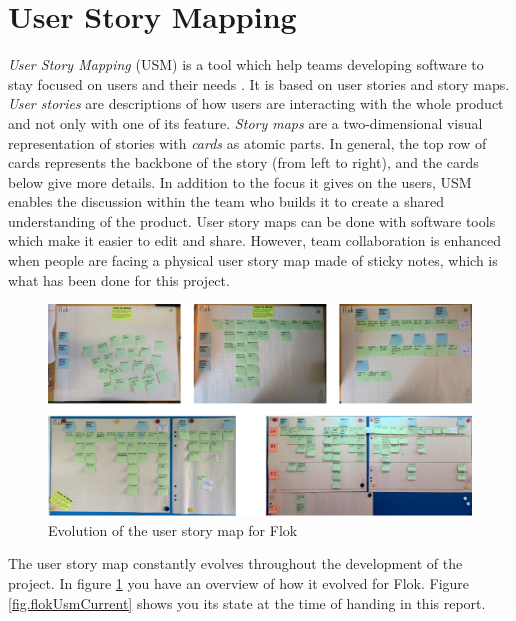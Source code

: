\documentclass[a4paper,12pt, oneside]{article}
\begin{document}
\section{User Story Mapping}
\emph{User Story Mapping} (USM) is a tool which help teams developing software to stay focused on users and their needs \cite{patton2014user}.
It is based on user stories and story maps. \emph{User stories} are descriptions of how users are interacting with the whole product and not only with one of its feature. \emph{Story maps} are a two-dimensional visual representation of stories with \emph{cards} as atomic parts.
In general, the top row of cards represents the backbone of the story (from left to right), and the cards below give more details.
In addition to the focus it gives on the users, USM enables the discussion within the team who builds it to create a shared understanding of the product.
User story maps can be done with software tools which make it easier to edit and share. However, team collaboration is enhanced when people are facing a physical user story map made of sticky notes, which is what has been done for this project.

\begin{figure}[!htb]
\centering
\includegraphics[width=\textwidth]{images/flokUsmEvolution.png}
\caption{Evolution of the user story map for Flok}
\label{fig.flokUsmEvolution}
\end{figure}

The user story map constantly evolves throughout the development of the project.
In figure \ref{fig.flokUsmEvolution} you have an overview of how it evolved for Flok.
Figure \ref{fig.flokUsmCurrent} shows you its state at the time of handing in this report.
\end{document}
